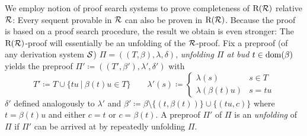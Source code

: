 We employ notion of proof search systems to prove completeness of $\mathrm{R}(\mathcal{R})$
  relative $\mathcal{R}$: Every sequent provable in $\mathcal{R}$ can also be proven in $\mathrm{R}(\mathcal{R})$.
  Because the proof is based on a proof search procedure, the result we obtain is
  even stronger: The $\mathrm{R}(\mathcal{R})$-proof will essentially be an unfolding of the $\mathcal{R}$-proof.
  Fix a preproof (of any derivation system $\mathcal{S}$) $\Pi = ((T, \beta), \lambda,
  \delta)$, \emph{unfolding $\Pi$ at bud $t \in \mathrm{dom}(\beta)$} yields the
  preproof $\Pi' \coloneq ((T', \beta'), \lambda', \delta')$ with
  \[
    T' \coloneq T \cup \{tu ~|~ \beta(t)u \in T\}
    \qquad
    \lambda'(s) \coloneq 
    \begin{cases}
      \lambda(s) & s \in T \\
      \lambda(\beta(t)u) & s = tu 
    \end{cases}
  \]
  $\delta'$ defined analogously to $\lambda'$ and $\beta' \coloneq \beta
  \setminus \{(t, \beta(t))\} \cup \{(tu, c)\}$ where $t = \beta(t)u$ and either
  $c = t$ or $c = \beta(t)$. A preproof $\Pi'$ of $\Pi$ is an \emph{unfolding} of $\Pi$
  if $\Pi'$ can be arrived at by repeatedly unfolding $\Pi$.

